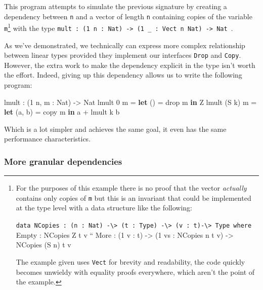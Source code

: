 \documentclass[
]{article}
\newenvironment{Shaded}{}{}
\newcommand{\DataTypeTok}[1]{\textcolor[rgb]{0.56,0.13,0.00}{#1}}
\newcommand{\DecValTok}[1]{\textcolor[rgb]{0.25,0.63,0.44}{#1}}
\newcommand{\FunctionTok}[1]{\textcolor[rgb]{0.02,0.16,0.49}{#1}}
\newcommand{\KeywordTok}[1]{\textcolor[rgb]{0.00,0.44,0.13}{\textbf{#1}}}
\newcommand{\NormalTok}[1]{#1}
\newcommand{\OperatorTok}[1]{\textcolor[rgb]{0.40,0.40,0.40}{#1}}
\newcommand{\OtherTok}[1]{\textcolor[rgb]{0.00,0.44,0.13}{#1}}
\begin{document}
This program attempts to simulate the previous signature by creating a
dependency between \texttt{n} and a vector of length \texttt{n}
containing copies of the variable \texttt{m}\footnote{For the purposes
  of this example there is no proof that the vector \emph{actually}
  contains only copies of \texttt{m} but this is an invariant that could
  be implemented at the type level with a data structure like the
  following:

  \texttt{data\ NCopies\ :\ (n\ :\ Nat)\ -\textbackslash{}\textgreater{}\ (t\ :\ Type)\ -\textbackslash{}\textgreater{}\ (v\ :\ t)-\textbackslash{}\textgreater{}\ Type\ where}
  Empty : NCopies Z t v `` More : (1 v : t) -\textgreater{} (1 vs :
  NCopies n t v) -\textgreater{} NCopies (S n) t v

  The example given uses \texttt{Vect} for brevity and readability, the
  code quickly becomes unwieldy with equality proofs everywhere, which
  aren't the point of the example.} with the type
\texttt{mult\ :\ (1\ n\ :\ Nat)\ -\textgreater{}\ (1\ \_\ :\ Vect\ n\ Nat)\ -\textgreater{}\ Nat~}.

As we've demonstrated, we technically can express more complex
relationship between linear types provided they implement our interfaces
\texttt{Drop} and \texttt{Copy}. However, the extra work to make the
dependency explicit in the type isn't worth the effort. Indeed, giving
up this dependency allows us to write the following program:

\begin{Shaded}
\begin{Highlighting}[]
\NormalTok{lmult }\OperatorTok{:}\NormalTok{ (}\DecValTok{1}\NormalTok{ n, m }\OperatorTok{:} \DataTypeTok{Nat}\NormalTok{) }\OtherTok{{-}\textgreater{}} \DataTypeTok{Nat}
\NormalTok{lmult }\DecValTok{0}\NormalTok{ m }\OtherTok{=} \KeywordTok{let}\NormalTok{ () }\OtherTok{=} \FunctionTok{drop}\NormalTok{ m }\KeywordTok{in} \DataTypeTok{Z}
\NormalTok{lmult (}\DataTypeTok{S}\NormalTok{ k) m }\OtherTok{=} \KeywordTok{let}\NormalTok{ (a, b) }\OtherTok{=}\NormalTok{ copy m }\KeywordTok{in}\NormalTok{ a }\OperatorTok{+}\NormalTok{ lmult k b}
\end{Highlighting}
\end{Shaded}

Which is a lot simpler and achieves the same goal, it even has the same
performance characteristics.

\hypertarget{more-granular-dependencies}{%
\subsubsection{More granular
dependencies}\label{more-granular-dependencies}}
\end{document}
